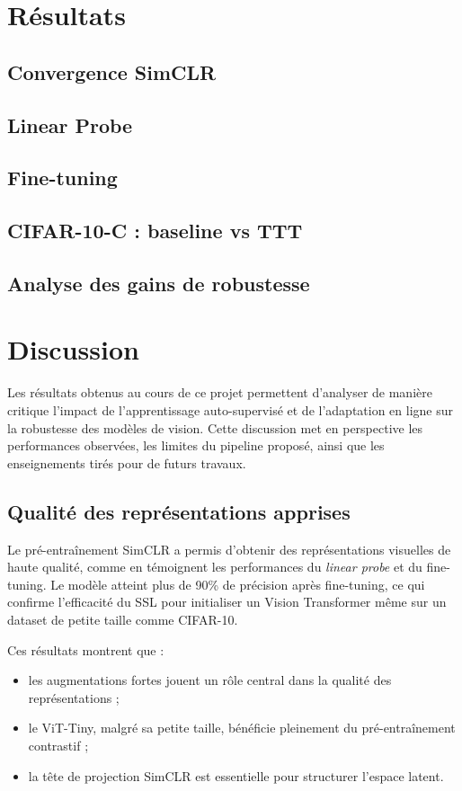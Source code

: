 \documentclass[12pt,a4paper]{report}
\begin{document}
	
	\chapter{Résultats}
	\section{Convergence SimCLR}
	\section{Linear Probe}
	\section{Fine-tuning}
	\section{CIFAR-10-C : baseline vs TTT}
	\section{Analyse des gains de robustesse}
	\chapter{Discussion}
	
	Les résultats obtenus au cours de ce projet permettent d’analyser de manière critique l’impact de l’apprentissage auto-supervisé et de l’adaptation en ligne sur la robustesse des modèles de vision. Cette discussion met en perspective les performances observées, les limites du pipeline proposé, ainsi que les enseignements tirés pour de futurs travaux.
	
	\section*{Qualité des représentations apprises}
	
	Le pré-entraînement SimCLR a permis d’obtenir des représentations visuelles de haute qualité, comme en témoignent les performances du \textit{linear probe} et du fine-tuning. Le modèle atteint plus de 90\% de précision après fine-tuning, ce qui confirme l’efficacité du SSL pour initialiser un Vision Transformer même sur un dataset de petite taille comme CIFAR-10.
	
	Ces résultats montrent que :
	\begin{itemize}
		\item les augmentations fortes jouent un rôle central dans la qualité des représentations ;
		\item le ViT-Tiny, malgré sa petite taille, bénéficie pleinement du pré-entraînement contrastif ;
		\item la tête de projection SimCLR est essentielle pour structurer l’espace latent.
	\end{itemize}
	
\end{document}
